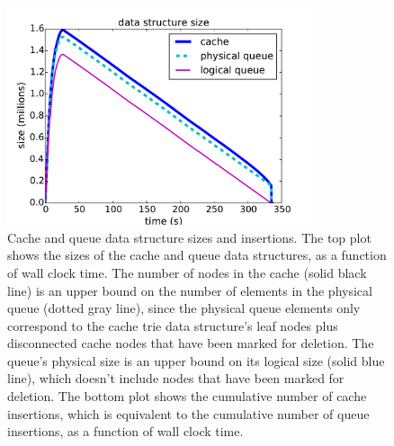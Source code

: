 \begin{arxiv}
\begin{figure}[t!]
\begin{center}
\includegraphics[width=0.8\textwidth]{figs/ela_compas-queue-cache-size-insertions.pdf}
\end{center}
\caption{Cache and queue data structure sizes and insertions.
%
The top plot shows the sizes of the cache and queue data structures,
as a function of wall clock time.
%
The number of nodes in the cache (solid black line) is an
upper bound on the number of elements in the physical queue
(dotted gray line), since the physical queue elements only
correspond to the cache trie data structure's leaf nodes
plus disconnected cache nodes that have been marked for deletion.
%
The queue's physical size is an upper bound on its
logical size (solid blue line), which doesn't include nodes
that have been marked for deletion.
%
The bottom plot shows the cumulative number of cache insertions,
which is equivalent to the cumulative number of queue insertions,
as a function of wall clock time.
}
\label{fig:queue-cache-size-insertions}
\end{figure}
\end{arxiv}


